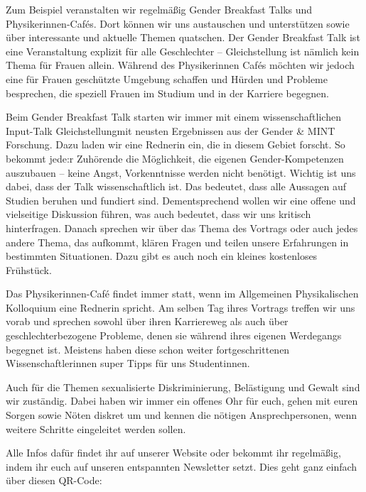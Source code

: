 \begin{multicols}{2}
Zum Beispiel veranstalten wir regelmäßig Gender Breakfast Talks und Physikerinnen-Cafés. Dort können wir uns austauschen und unterstützen sowie über interessante und aktuelle Themen quatschen. Der Gender Breakfast Talk ist eine Veranstaltung explizit für alle Geschlechter – Gleichstellung ist nämlich kein Thema für Frauen allein. Während des Physikerinnen Cafés möchten wir jedoch eine für Frauen geschützte Umgebung schaffen und Hürden und Probleme besprechen, die speziell Frauen im Studium und in der Karriere begegnen.

Beim Gender Breakfast Talk starten wir immer mit einem wissenschaftlichen Input-Talk Gleichstellungmit neusten Ergebnissen aus der Gender \& MINT Forschung. Dazu laden wir eine Rednerin ein, die in diesem Gebiet forscht. So bekommt jede:r Zuhörende die Möglichkeit, die eigenen Gender-Kompetenzen auszubauen – keine Angst, Vorkenntnisse werden nicht benötigt. Wichtig ist uns dabei, dass der Talk wissenschaftlich ist. Das bedeutet, dass alle Aussagen auf Studien beruhen und fundiert sind. Dementsprechend wollen wir eine offene und vielseitige Diskussion führen, was auch bedeutet, dass wir uns kritisch hinterfragen. Danach sprechen wir über das Thema des Vortrags oder auch jedes andere Thema, das aufkommt, klären Fragen und teilen unsere Erfahrungen in bestimmten Situationen. Dazu gibt es auch noch ein kleines kostenloses Frühstück.

Das Physikerinnen-Café findet immer statt, wenn im Allgemeinen Physikalischen Kolloquium eine Rednerin spricht. Am selben Tag ihres Vortrags treffen wir uns vorab und sprechen sowohl über ihren Karriereweg als auch über geschlechterbezogene Probleme, denen sie während ihres eigenen Werdegangs begegnet ist. Meistens haben diese schon weiter fortgeschrittenen Wissenschaftlerinnen super Tipps für uns Studentinnen.

Auch für die Themen sexualisierte Diskriminierung, Belästigung und Gewalt sind wir zuständig. Dabei haben wir immer ein offenes Ohr für euch, gehen mit euren Sorgen sowie Nöten diskret um und kennen die nötigen Ansprechpersonen, wenn weitere Schritte eingeleitet werden sollen.

\begin{multicols}{2}
Alle Infos dafür findet ihr auf unserer \mbox{Website\footnotemark} oder bekommt ihr regelmäßig, indem ihr euch auf unseren entspannten Newsletter setzt. Dies geht ganz einfach über diesen QR-Code:
\end{multicols}


\end{multicols}
